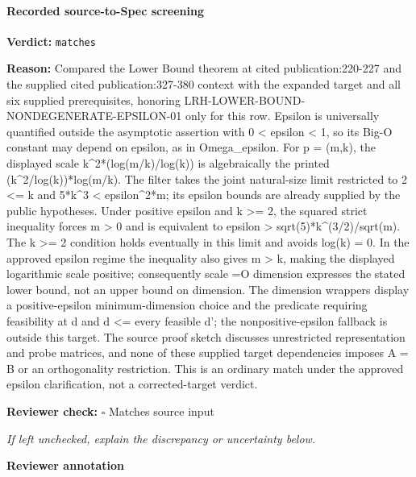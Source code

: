 \documentclass[10pt]{article}
\newcommand{\reviewerbox}{%
  \par\noindent\fbox{\parbox{0.96\linewidth}{\rule{0pt}{0.38in}}}\par
}
\newcommand{\reviewmatch}[1]{%
  \par\noindent\textbf{Reviewer check:} $\square$\; #1\par
  \noindent\emph{If left unchecked, explain the discrepancy or uncertainty below.}\par
}
\begin{document}
\paragraph{Recorded source-to-Spec screening}
\textbf{Verdict:} \texttt{matches}
\\
{\raggedright
\textbf{Reason:} Compared the Lower Bound theorem at cited publication:\allowbreak{}220-\allowbreak{}227 and the supplied cited publication:\allowbreak{}327-\allowbreak{}380 context with the expanded target and all six supplied prerequisites, honoring LRH-\allowbreak{}LOWER-\allowbreak{}BOUND-\allowbreak{}NONDEGENERATE-\allowbreak{}EPSILON-\allowbreak{}01 only for this row.\allowbreak{} Epsilon is universally quantified outside the asymptotic assertion with 0 < epsilon < 1, so its Big-\allowbreak{}O constant may depend on epsilon, as in Omega\_\allowbreak{}epsilon.\allowbreak{} For p = (m,k), the displayed scale k\textasciicircum{}2*(log(m/\allowbreak{}k)/\allowbreak{}log(k)) is algebraically the printed (k\textasciicircum{}2/\allowbreak{}log(k))*log(m/\allowbreak{}k).\allowbreak{} The filter takes the joint natural-\allowbreak{}size limit restricted to 2 <= k and 5*k\textasciicircum{}3 < epsilon\textasciicircum{}2*m;\allowbreak{} its epsilon bounds are already supplied by the public hypotheses.\allowbreak{} Under positive epsilon and k >= 2, the squared strict inequality forces m > 0 and is equivalent to epsilon > sqrt(5)*k\textasciicircum{}(3/\allowbreak{}2)/\allowbreak{}sqrt(m).\allowbreak{} The k >= 2 condition holds eventually in this limit and avoids log(k) = 0.\allowbreak{} In the approved epsilon regime the inequality also gives m > k, making the displayed logarithmic scale positive;\allowbreak{} consequently scale =O dimension expresses the stated lower bound, not an upper bound on dimension.\allowbreak{} The dimension wrappers display a positive-\allowbreak{}epsilon minimum-\allowbreak{}dimension choice and the predicate requiring feasibility at d and d <= every feasible d';\allowbreak{} the nonpositive-\allowbreak{}epsilon fallback is outside this target.\allowbreak{} The source proof sketch discusses unrestricted representation and probe matrices, and none of these supplied target dependencies imposes A = B or an orthogonality restriction.\allowbreak{} This is an ordinary match under the approved epsilon clarification, not a corrected-\allowbreak{}target verdict.\allowbreak{}
\par}
\reviewmatch{Matches source input}
\noindent\textbf{Reviewer annotation}\par
\reviewerbox
\clearpage
\hypertarget{source-claim-5793edfccf93335e}{}
\end{document}

